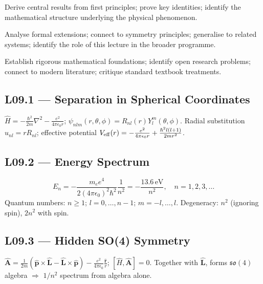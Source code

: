 \quad
Derive central results from first principles; prove key identities; identify
the mathematical structure underlying the physical phenomenon.

\quad
Analyse formal extensions; connect to symmetry principles; generalise to
related systems; identify the role of this lecture in the broader programme.

\quad
Establish rigorous mathematical foundations; identify open research problems;
connect to modern literature; critique standard textbook treatments.


\subsection*{L09.1 — Separation in Spherical Coordinates}
$\hat{H} = -\frac{\hbar^2}{2m}\nabla^2 - \frac{e^2}{4\pi\epsilon_0 r}$;
$\psi_{nlm}(r,\theta,\phi)=R_{nl}(r)Y_l^m(\theta,\phi)$.
Radial substitution $u_{nl}=rR_{nl}$; effective potential
$V_{\rm eff}(r) = -\frac{e^2}{4\pi\epsilon_0 r} + \frac{\hbar^2 l(l+1)}{2mr^2}$.

\subsection*{L09.2 — Energy Spectrum}
\begin{tcolorbox}[lecturebox, title={Hydrogen Spectrum}]
\begin{equation}
  E_n = -\frac{m_e e^4}{2(4\pi\epsilon_0)^2\hbar^2}\frac{1}{n^2}
       = -\frac{13.6\,\text{eV}}{n^2}, \quad n=1,2,3,\ldots
  \label{eq:L09.1}
\end{equation}
Quantum numbers: $n\geq1$; $l=0,\ldots,n-1$; $m=-l,\ldots,l$.
Degeneracy: $n^2$ (ignoring spin), $2n^2$ with spin.
\end{tcolorbox}

\subsection*{L09.3 — Hidden SO(4) Symmetry}
\begin{tcolorbox}[lecturebox, title={Runge–Lenz Vector}]
$\hat{\mathbf{A}} = \frac{1}{2m}(\hat{\mathbf{p}}\times\hat{\mathbf{L}}-\hat{\mathbf{L}}\times\hat{\mathbf{p}})
  - \frac{e^2}{4\pi\epsilon_0}\frac{\hat{\mathbf{r}}}{r}$;
$[\hat{H},\hat{\mathbf{A}}]=0$. Together with $\hat{\mathbf{L}}$, forms $\mathfrak{so}(4)$ algebra
$\Rightarrow$ $1/n^2$ spectrum from algebra alone.
\end{tcolorbox}

